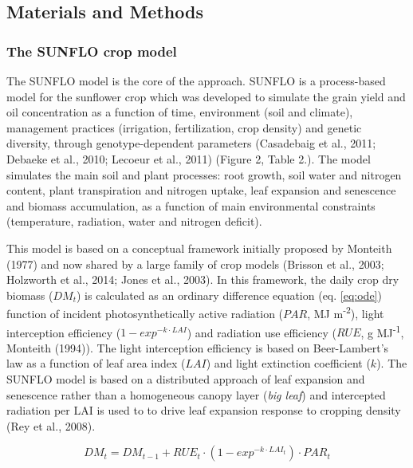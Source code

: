 \documentclass[a4paper]{article}
\begin{document}
\subsection{Materials and Methods}\label{materials-and-methods}

\subsubsection{The SUNFLO crop model}\label{the-sunflo-crop-model}

The SUNFLO model is the core of the approach. SUNFLO is a process-based
model for the sunflower crop which was developed to simulate the grain
yield and oil concentration as a function of time, environment (soil and
climate), management practices (irrigation, fertilization, crop density)
and genetic diversity, through genotype-dependent parameters (Casadebaig
et al., 2011; Debaeke et al., 2010; Lecoeur et al., 2011) (Figure 2,
Table 2.). The model simulates the main soil and plant processes: root
growth, soil water and nitrogen content, plant transpiration and
nitrogen uptake, leaf expansion and senescence and biomass accumulation,
as a function of main environmental constraints (temperature, radiation,
water and nitrogen deficit).

This model is based on a conceptual framework initially proposed by
Monteith (1977) and now shared by a large family of crop models (Brisson
et al., 2003; Holzworth et al., 2014; Jones et al., 2003). In this
framework, the daily crop dry biomass (\(DM_t\)) is calculated as an
ordinary difference equation (eq. \ref{eq:ode}) function of incident
photosynthetically active radiation (\(PAR\), MJ m\textsuperscript{-2}),
light interception efficiency (\(1-exp^{-k \cdot LAI}\)) and radiation
use efficiency (\(RUE\), g MJ\textsuperscript{-1}, Monteith (1994)). The
light interception efficiency is based on Beer-Lambert's law as a
function of leaf area index (\(LAI\)) and light extinction coefficient
(\(k\)). The SUNFLO model is based on a distributed approach of leaf
expansion and senescence rather than a homogeneous canopy layer
(\emph{big leaf}) and intercepted radiation per LAI is used to to drive
leaf expansion response to cropping density (Rey et al., 2008).

\begin{equation}
  DM_t = DM_{t-1} + RUE_t \cdot (1-exp^{-k \cdot LAI_t}) \cdot PAR_t
  \label{eq:ode}
\end{equation}
\end{document}
